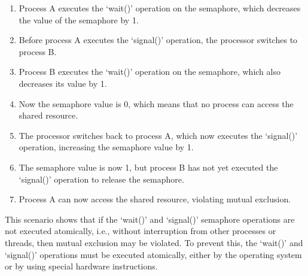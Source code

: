 \documentclass{article}
\begin{document}
\begin{enumerate}
	\item Process A executes the `wait()' operation on the semaphore, which decreases the value of the semaphore by 1.
	\item Before process A executes the `signal()' operation, the processor switches to process B.
	\item Process B executes the `wait()' operation on the semaphore, which also decreases its value by 1.
	\item Now the semaphore value is 0, which means that no process can access the shared resource.
	\item The processor switches back to process A, which now executes the `signal()' operation, increasing the semaphore value by 1.
	\item The semaphore value is now 1, but process B has not yet executed the `signal()' operation to release the semaphore.
	\item Process A can now access the shared resource, violating mutual exclusion.
\end{enumerate}
This scenario shows that if the `wait()' and `signal()' semaphore operations are not executed atomically, i.e., without interruption from other processes or threads, then mutual exclusion may be violated. To prevent this, the `wait()' and `signal()' operations must be executed atomically, either by the operating system or by using special hardware instructions.
\end{document}
